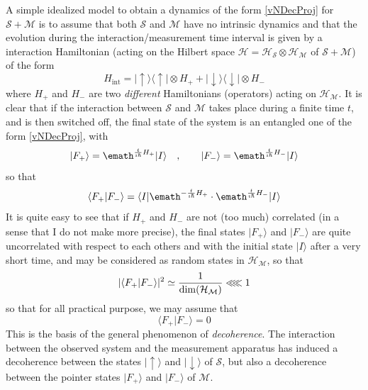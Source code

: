 A simple idealized model to obtain a dynamics of the form \ref{vNDecProj} for $\mathcal{S}+\mathcal{M}$ is to assume that both $\mathcal{S}$ and $\mathcal{M}$ have no intrinsic dynamics and that the evolution during the interaction/measurement time interval is given by a interaction Hamiltonian (acting on the Hilbert space $\mathcal{H}=\mathcal{H}_\mathcal{S}\otimes\mathcal{H}_\mathcal{M}$ of $\mathcal{S}+\mathcal{M}$)  of  the form
 \begin{equation}
\label{Hdec}
H_\mathrm{int}=  |  {\uparrow}\rangle \langle {\uparrow} |  \otimes  H_+ +  |  {\downarrow}\rangle \langle  {\downarrow} |  \otimes  H_-
\end{equation}
where $H_+$ and $H_-$ are two \emph{different} Hamiltonians (operators) acting on $\mathcal{H}_\mathcal{M}$.
It is clear that if the interaction between $\mathcal{S}$ and $\mathcal{M}$ takes place during a finite time $t$, and is then switched off, the final state of the system is an entangled one of the form \ref{vNDecProj}, with
\begin{equation}
\label{F+F-Exp}
|F_+ \rangle = \emath^{{t\over \imath\hbar} H_+} |I\rangle
\quad,\qquad
|F_- \rangle = \emath^{{t\over \imath\hbar} H_-} | I \rangle
\end{equation}
so that
\begin{equation}
\label{F+F-Overlap}
\langle F_+|F_-\rangle = \langle I | \emath^{-{t\over \imath\hbar} H_+} \cdot\emath^{{t\over \imath\hbar} H_-} |I\rangle
\end{equation}
It is quite easy to see that if $H_+$ and $H_-$ are not (too much) correlated (in a sense that I do not make more precise), the final states $|F_+\rangle$ and $|F_-\rangle$ are quite uncorrelated with respect to each others and with the initial state $|I\rangle$  after a very short time, and may be considered as random states in $\mathcal{H}_\mathcal{M}$, so that 
\begin{equation}
\label{F+F-OSm}
|\langle F_+|F_-\rangle|^2\simeq {1\over\dim(\mathcal{H}_\mathcal{M})}\ll\!\! \ll 1
\end{equation}
so that for all practical purpose, we may assume that
\begin{equation}
\label{F+F-zero}
\langle F_+ | F_-\rangle =0
\end{equation}
This is the basis of the general phenomenon of \emph{decoherence}. 
The interaction between the observed system and the measurement apparatus has induced a decoherence between the states $|\uparrow\rangle$ and $| \downarrow \rangle$ of $\mathcal{S}$, but also a decoherence between the pointer states $| F_+\rangle$ and $| F_-\rangle$ of $\mathcal{M}$.

